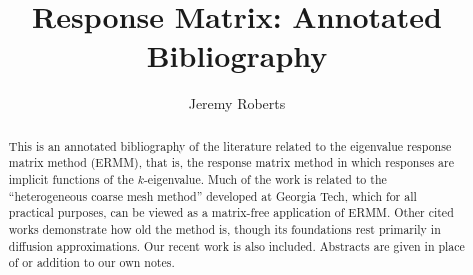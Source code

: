 \documentclass[letterpaper,12pt]{article}
\title{Response Matrix: Annotated Bibliography}
\author{Jeremy Roberts}
\begin{document}
 
\maketitle
\nocite{*}

\begin{abstract}
  This is an annotated bibliography of the literature related to the eigenvalue response matrix method (ERMM), that is, the response matrix method in which responses are implicit functions of the $k$-eigenvalue.  Much of the work is related to the ``heterogeneous coarse mesh method'' developed at Georgia Tech, which for all practical purposes, can be viewed as a matrix-free application of ERMM.  Other cited works demonstrate how old the method is, though its foundations rest primarily in diffusion approximations.  Our recent work is also included.  Abstracts are given in place of or addition to our own notes.
\end{abstract}



\end{document}
